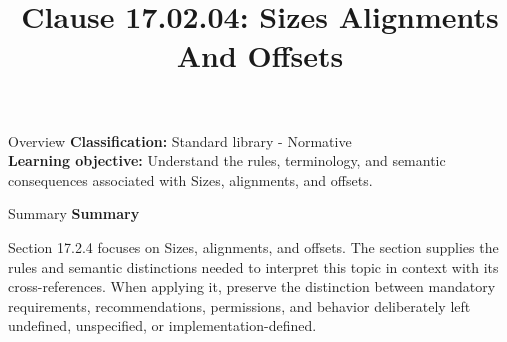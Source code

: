 \documentclass[10pt,letterpaper]{article}
\title{Clause 17.02.04: Sizes Alignments And Offsets}
\author{}
\date{}
\begin{document}
\maketitle
\begin{CornellOverviewBox}{Overview}
\textbf{Classification:} Standard library - Normative\\[2pt]
\textbf{Learning objective:} Understand the rules, terminology, and semantic consequences associated with Sizes, alignments, and offsets.
\end{CornellOverviewBox}\begin{CornellSummaryBox}{Summary}
{\sffamily\bfseries\color{Accent} Summary}\par\vspace{3pt}Section 17.2.4 focuses on Sizes, alignments, and offsets. The section supplies the rules and semantic distinctions needed to interpret this topic in context with its cross-references. When applying it, preserve the distinction between mandatory requirements, recommendations, permissions, and behavior deliberately left undefined, unspecified, or implementation-defined.
\end{CornellSummaryBox}
\end{document}
